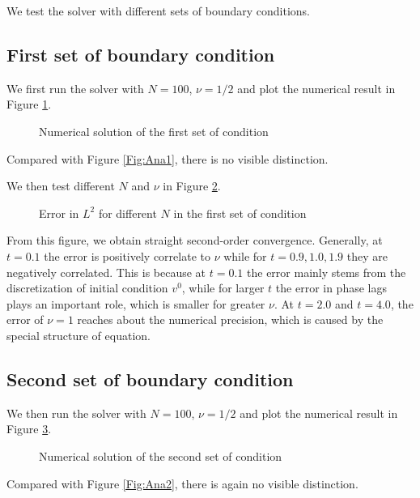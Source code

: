 \documentclass[english, nochinese]{pnote}
\begin{document}
We test the solver with different sets of boundary conditions.

\subsection{First set of boundary condition}

We first run the solver with $ N = 100 $, $ \nu = 1 / 2 $ and plot the numerical result in Figure \ref{Fig:Num1}.

\begin{figure}[htbp]
\centering

\caption{Numerical solution of the first set of condition}
\label{Fig:Num1}
\end{figure}

Compared with Figure \ref{Fig:Ana1}, there is no visible distinction.

We then test different $N$ and $\nu$ in Figure \ref{Fig:Comp1}.

\begin{figure}[htbp]
\centering
\scalebox{0.7}{}
\caption{Error in $L^2$ for different $N$ in the first set of condition}
\label{Fig:Comp1}
\end{figure}

From this figure, we obtain straight second-order convergence. Generally, at $ t = 0.1 $ the error is positively correlate to $\nu$ while for $ t = 0.9, 1.0, 1.9 $ they are negatively correlated. This is because at $ t = 0.1 $ the error mainly stems from the discretization of initial condition $v^0$, while for larger $t$ the error in phase lags plays an important role, which is smaller for greater $\nu$. At $ t = 2.0 $ and $ t = 4.0 $, the error of $ \nu = 1 $ reaches about the numerical precision, which is caused by the special structure of equation.

\subsection{Second set of boundary condition}

We then run the solver with $ N = 100 $, $ \nu = 1 / 2 $ and plot the numerical result in Figure \ref{Fig:Num2}.

\begin{figure}[htbp]
\centering

\caption{Numerical solution of the second set of condition}
\label{Fig:Num2}
\end{figure}

Compared with Figure \ref{Fig:Ana2}, there is again no visible distinction.
\end{document}

